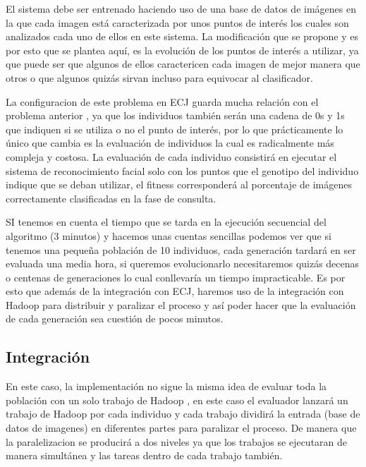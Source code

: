 El sistema debe ser entrenado haciendo uso de una base de datos de imágenes en la que cada imagen est\'a caracterizada por unos puntos de interés los cuales son analizados cada uno de ellos en este sistema. La modificación que se propone y es por esto que se plantea aquí, es la evolución de los puntos de interés a utilizar, ya que puede ser que algunos de ellos caractericen cada imagen de mejor manera que otros o que algunos quizás sirvan incluso para equivocar al clasificador.

La configuracion de este problema en ECJ guarda mucha relación con el problema anterior , ya que los individuos también serán una cadena de 0s y 1s que indiquen si se utiliza o no el punto de interés, por lo que prácticamente lo único que cambia es la evaluación de individuos la cual es radicalmente m\'as compleja y costosa. La evaluación de cada individuo consistirá en ejecutar el sistema de reconocimiento facial solo con los puntos que el genotipo del individuo indique que se deban utilizar, el fitness corresponderá al porcentaje de imágenes correctamente clasificadas en la fase de consulta.

SI tenemos en cuenta el tiempo que se tarda en la ejecución secuencial del algoritmo (3 minutos) y hacemos unas cuentas sencillas podemos ver que si tenemos una peque\~na población de 10 individuos, cada generación tardar\'a en ser evaluada una media hora, si queremos evolucionarlo necesitaremos quizás decenas o centenas de generaciones lo cual conllevar\'ia un tiempo impracticable. Es por esto que adem\'as de la integración con ECJ, haremos uso de la integración con Hadoop para distribuir y paralizar el proceso y así poder hacer que la evaluación de cada generación sea cuestión de pocos minutos.

\subsection{Integraci\'on}

En este caso, la implementación no sigue la misma idea de evaluar toda la población con un solo trabajo de Hadoop , en este caso el evaluador lanzar\'a un trabajo de Hadoop por cada individuo y cada trabajo dividir\'a la entrada (base de datos de imagenes) en diferentes partes para paralizar el proceso. De manera que la paralelizacion se producirá a dos niveles ya que los trabajos se ejecutaran de manera simultánea y las tareas dentro de cada trabajo también.

